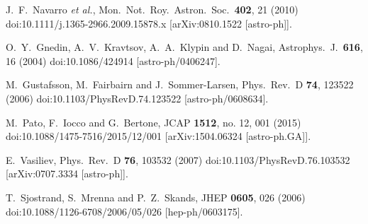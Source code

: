 \documentclass[11pt]{article}
\begin{document}
\begin{thebibliography}{99}
  J.~F.~Navarro {\it et al.},
  Mon.\ Not.\ Roy.\ Astron.\ Soc.\  {\bf 402}, 21 (2010)
  doi:10.1111/j.1365-2966.2009.15878.x
  [arXiv:0810.1522 [astro-ph]].
    
  
  O.~Y.~Gnedin, A.~V.~Kravtsov, A.~A.~Klypin and D.~Nagai,
  Astrophys.\ J.\  {\bf 616}, 16 (2004)
  doi:10.1086/424914
  [astro-ph/0406247].
  
  M.~Gustafsson, M.~Fairbairn and J.~Sommer-Larsen,
  Phys.\ Rev.\ D {\bf 74}, 123522 (2006)
  doi:10.1103/PhysRevD.74.123522
  [astro-ph/0608634].
  
  
  M.~Pato, F.~Iocco and G.~Bertone,
  JCAP {\bf 1512}, no. 12, 001 (2015)
  doi:10.1088/1475-7516/2015/12/001
  [arXiv:1504.06324 [astro-ph.GA]].
  
  
  E.~Vasiliev,
  Phys.\ Rev.\ D {\bf 76}, 103532 (2007)
  doi:10.1103/PhysRevD.76.103532
  [arXiv:0707.3334 [astro-ph]].
  
  
  T.~Sjostrand, S.~Mrenna and P.~Z.~Skands,
  JHEP {\bf 0605}, 026 (2006)
  doi:10.1088/1126-6708/2006/05/026
  [hep-ph/0603175].






\end{thebibliography}
\end{document}
